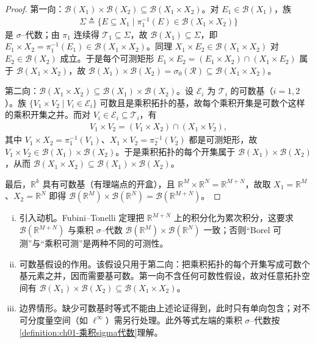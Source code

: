 \documentclass[../../main.tex]{subfiles}%
\begin{document}
\begin{proof}
第一向：$\mathcal{B}(X_1)\times\mathcal{B}(X_2)\subseteq\mathcal{B}(X_1\times X_2)$。对 $E_1\in\mathcal{B}(X_1)$，族
\begin{align*}
\Sigma\triangleq\{E\subseteq X_1\mid\pi_1^{-1}(E)\in\mathcal{B}(X_1\times X_2)\}
\end{align*}
是 $\sigma$--代数；由 $\pi_1$ 连续得 $\mathcal{T}_1\subseteq\Sigma$，故 $\mathcal{B}(X_1)\subseteq\Sigma$，即 $E_1\times X_2=\pi_1^{-1}(E_1)\in\mathcal{B}(X_1\times X_2)$。同理 $X_1\times E_2\in\mathcal{B}(X_1\times X_2)$ 对 $E_2\in\mathcal{B}(X_2)$ 成立。于是每个可测矩形 $E_1\times E_2=(E_1\times X_2)\cap(X_1\times E_2)$ 属于 $\mathcal{B}(X_1\times X_2)$，故 $\mathcal{B}(X_1)\times\mathcal{B}(X_2)=\sigma_0(\mathcal{R})\subseteq\mathcal{B}(X_1\times X_2)$。

第二向：$\mathcal{B}(X_1\times X_2)\subseteq\mathcal{B}(X_1)\times\mathcal{B}(X_2)$。设 $\mathcal{E}_i$ 为 $\mathcal{T}_i$ 的可数基（$i=1,2$）。族 $\{V_1\times V_2\mid V_i\in\mathcal{E}_i\}$ 可数且是乘积拓扑的基，故每个乘积开集是可数个这样的乘积开集之并。而对 $V_i\in\mathcal{E}_i\subseteq\mathcal{T}_i$，有
\begin{align*}
V_1\times V_2=(V_1\times X_2)\cap(X_1\times V_2),
\end{align*}
其中 $V_1\times X_2=\pi_1^{-1}(V_1)$、$X_1\times V_2=\pi_2^{-1}(V_2)$ 都是可测矩形，故 $V_1\times V_2\in\mathcal{B}(X_1)\times\mathcal{B}(X_2)$。于是乘积拓扑的每个开集属于 $\mathcal{B}(X_1)\times\mathcal{B}(X_2)$，从而 $\mathcal{B}(X_1\times X_2)\subseteq\mathcal{B}(X_1)\times\mathcal{B}(X_2)$。

最后，$\mathbb{R}^k$ 具有可数基（有理端点的开盒），且 $\mathbb{R}^M\times\mathbb{R}^N=\mathbb{R}^{M+N}$，故取 $X_1=\mathbb{R}^M$、$X_2=\mathbb{R}^N$ 即得 $\mathcal{B}(\mathbb{R}^M)\times\mathcal{B}(\mathbb{R}^N)=\mathcal{B}(\mathbb{R}^{M+N})$。
\end{proof}

\begin{remark}\label{remark:ch01-Borel乘积}
\begin{enumerate}[(i)]
\item 引入动机。Fubini--Tonelli 定理把 $\mathbb{R}^{M+N}$ 上的积分化为累次积分，这要求 $\mathcal{B}(\mathbb{R}^{M+N})$ 与乘积 $\sigma$--代数 $\mathcal{B}(\mathbb{R}^M)\times\mathcal{B}(\mathbb{R}^N)$ 一致；否则“Borel 可测”与“乘积可测”是两种不同的可测性。
\item 可数基假设的作用。该假设只用于第二向：把乘积拓扑的每个开集写成可数个基元素之并，因而需要基可数。第一向不含任何可数性假设，故对任意拓扑空间有 $\mathcal{B}(X_1)\times\mathcal{B}(X_2)\subseteq\mathcal{B}(X_1\times X_2)$。
\item 边界情形。缺少可数基时等式不能由上述论证得到，此时只有单向包含；对不可分度量空间（如 $\ell^\infty$）需另行处理。此外等式左端的乘积 $\sigma$--代数按\cref{definition:ch01-乘积sigma代数}理解。
\end{enumerate}
\end{remark}
\end{document}
